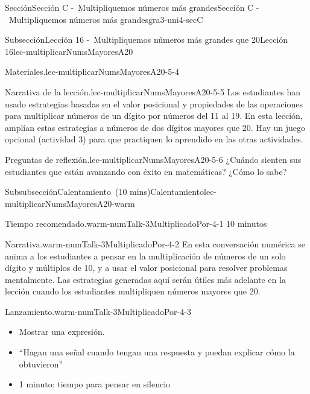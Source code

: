 \documentclass[oneside,10pt,]{article}
\begin{document}
\begin{sectionptx}{Sección}{Sección C -~Multipliquemos números más grandes}{}{Sección C -~Multipliquemos números más grandes}{}{}{gra3-uni4-secC}
\begin{subsectionptx}{Subsección}{Lección 16 -~Multipliquemos números más grandes que 20}{}{Lección 16}{}{}{lec-multiplicarNumsMayoresA20}
\begin{introduction}{}
\begin{paragraphs}{Materiales.}{lec-multiplicarNumsMayoresA20-5-4}
\begin{itemize}[label=\textbullet]
\begin{itemize}[label=$\circ$]
\end{itemize}
\end{itemize}
\end{paragraphs}%
\begin{paragraphs}{Narrativa de la lección.}{lec-multiplicarNumsMayoresA20-5-5}%
Los estudiantes han usado estrategias basadas en el valor posicional y propiedades de las operaciones para multiplicar números de un dígito por números del 11 al 19. En esta lección, amplían estas estrategias a números de dos dígitos mayores que 20. Hay un juego opcional (actividad 3) para que practiquen lo aprendido en las otras actividades.%
\end{paragraphs}%
\begin{paragraphs}{Preguntas de reflexión.}{lec-multiplicarNumsMayoresA20-5-6}%
¿Cuándo sienten sus estudiantes que están avanzando con éxito en matemáticas? ¿Cómo lo sabe?%
\end{paragraphs}%
\end{introduction}%
%
%
\typeout{************************************************}
\typeout{************************************************}
%
\begin{subsubsectionptx}{Subsubsección}{Calentamiento~(10 mins)}{}{Calentamiento}{}{}{lec-multiplicarNumsMayoresA20-warm}
\par
\begin{paragraphs}{Tiempo recomendado.}{warm-numTalk-3MultiplicadoPor-4-1}%
10 minutos%
\end{paragraphs}%
\begin{paragraphs}{Narrativa.}{warm-numTalk-3MultiplicadoPor-4-2}%
En esta conversación numérica se anima a los estudiantes a pensar en la multiplicación de números de un solo dígito y múltiplos de 10, y a usar el valor posicional para resolver problemas mentalmente. Las estrategias generadas aquí serán útiles más adelante en la lección cuando los estudiantes multipliquen números mayores que 20.%
\end{paragraphs}%
\begin{paragraphs}{Lanzamiento.}{warm-numTalk-3MultiplicadoPor-4-3}%
%
\begin{itemize}[label=\textbullet]
\item{}Mostrar una expresión.%
\item{}``Hagan una señal cuando tengan una respuesta y puedan explicar cómo la obtuvieron''%
\item{}1 minuto: tiempo para pensar en silencio%
\end{itemize}

\end{paragraphs}
\end{subsubsectionptx}
\end{subsectionptx}
\end{sectionptx}
\end{document}
